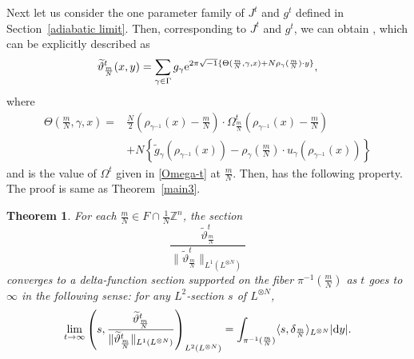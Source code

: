 \documentclass[pdftex]{sigma}
\numberwithin{equation}{section}
\newtheorem{Theorem}{Theorem}[section]
\newcommand{\Z}{\mathbb{Z}}
\renewcommand{\tilde}{\widetilde}
\newcommand{\abs}[1]{\lvert#1\rvert}
\newcommand{\norm}[1]{\lVert#1\rVert}
\begin{document}
Next let us consider the one parameter family of $J^t$ and $g^t$ defined in Section~\ref{adiabatic limit}. Then, corresponding to $J^t$ and $g^t$, we can obtain \smash{${\tilde \vartheta}_{\frac{m}{N}}^t$}, which can be explicitly described as
\begin{equation*}
{\tilde \vartheta}_{\frac{m}{N}}^t(x,y)=\sum_{\gamma\in \Gamma}g_\gamma {\rm e}^{2\pi\sqrt{-1}\{\Theta(\frac{m}{N},\gamma, x) +N\rho_\gamma (\frac{m}{N})\cdot y\}},
\end{equation*}
where
\begin{align*}
\Theta\left(\frac{m}{N}, \gamma ,x\right)={}&
\frac{N}{2}\left(\rho_{\gamma^{-1}}(x)-\frac{m}{N}\right)\cdot \Omega^t_{\frac{m}{N}}\left(\rho_{\gamma^{-1}}(x)-\frac{m}{N}\right)\\
&+N\left\{{\tilde g}_\gamma (\rho_{\gamma^{-1}}(x))-\rho_{\gamma}\left(\frac{m}{N}\right)\cdot u_\gamma (\rho_{\gamma^{-1}}(x))\right\}
\end{align*}
and  is the value of $\Omega^t$ given in \eqref{Omega-t} at $\frac{m}{N}$.
Then, \smash{${\tilde \vartheta}_{\frac{m}{N}}^t$} has the following property. The proof is same as Theorem~\ref{main3}.
\begin{Theorem}\label{main4}
For each $\frac{m}{N}\in F\cap \frac{1}{N}\Z^n$, the section
\[
 \frac{{\tilde \vartheta}^t_{\frac{m}{N}}}{\norm{{\tilde \vartheta}^t_{\frac{m}{N}}}_{L^1(L^{\otimes N})}}
 \]
 converges to a delta-function section supported on the fiber $\pi^{-1}(\frac{m}{N})$ as $t$ goes to $\infty$ in the following sense: for any $L^2$-section $s$ of $L^{\otimes N}$,
\begin{equation*}
\lim_{t\to \infty}\left(s, \frac{{\tilde \vartheta}^t_{\frac{m}{N}}}{\norm{{\tilde \vartheta}^t_{\frac{m}{N}}}_{L^1(L^{\otimes N})}}\right)_{L^2(L^{\otimes N})}
=\int_{\pi^{-1}(\frac{m}{N})}\langle s,\delta_{\frac{m}{N}}\rangle_{L^{\otimes N}} \abs{{\rm d}y}.
\end{equation*}
\end{Theorem}
\end{document}

